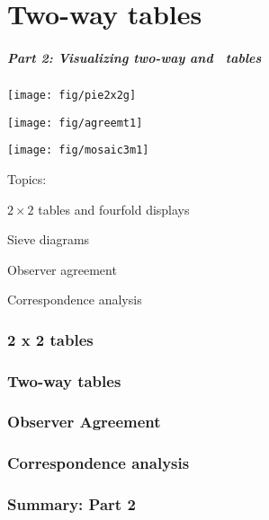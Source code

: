 \renewcommand{\FileName}{part2}
\part{Two-way tables}
\begin{frame}
  \frametitle{Part 2: Visualizing two-way and \nway\ tables}
 \begin{minipage}[c]{.33\textwidth}
  \texttt{[image: fig/pie2x2g]}
  \end{minipage}%
 \hfill
 \begin{minipage}[c]{.33\textwidth}
  \texttt{[image: fig/agreemt1]}
 \end{minipage}
 \hfill
 \begin{minipage}[c]{.33\textwidth}
  \texttt{[image: fig/mosaic3m1]}
 \end{minipage}

Topics:
  \begin{itemize*}
    \item $2 \times 2$ tables and fourfold displays
	\item Sieve diagrams
	\item Observer agreement
	\item Correspondence analysis
  \end{itemize*}
\end{frame}



\section{2 x 2 tables}

\section{Two-way tables}

\section{Observer Agreement}

\section{Correspondence analysis}

\section{Summary: Part 2}


\endinput